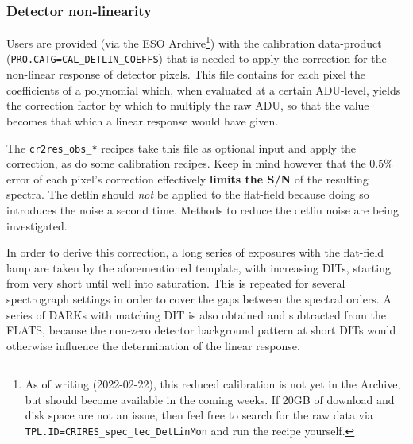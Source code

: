 \subsubsection{Detector non-linearity}
\label{sec:detlin}



Users are provided (via the ESO Archive\footnote{As of writing (2022-02-22),
this reduced calibration is not yet in the Archive, but should become available
in the coming weeks. If 20GB of download and disk space are not an issue, then
feel free to search for the raw data via
\texttt{TPL.ID=CRIRES\_spec\_tec\_DetLinMon} and run the recipe yourself.}) with the
calibration data-product (\verb!PRO.CATG=CAL_DETLIN_COEFFS!) that is needed to
apply the correction for the non-linear response of detector pixels. This file
contains for each pixel the coefficients of a polynomial which, when evaluated
at a certain ADU-level, yields the correction factor by which to multiply the
raw ADU, so that the value becomes that which a linear response would have
given.

The \verb!cr2res_obs_*! recipes take this file as optional input and apply the
correction, as do some calibration recipes. Keep in mind however that the
$0.5\%$ error of each pixel's correction effectively \textbf{limits the S/N} of
the resulting spectra. The detlin should \emph{not} be applied to the flat-field
because doing so introduces the noise a second time. Methods to reduce the
detlin noise are being investigated.


In order to derive this correction, a long series of exposures with the
flat-field lamp are taken by the aforementioned template, with increasing DITs,
starting from very short until well into saturation. This is repeated for
several spectrograph settings in order to cover the gaps between the spectral
orders. A series of DARKs with matching DIT is also obtained and subtracted from
the FLATS, because the non-zero detector background pattern at short DITs would
otherwise influence the determination of the linear response.

